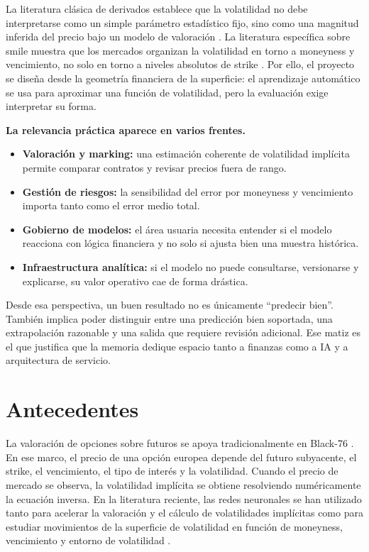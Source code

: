 La literatura clásica de derivados establece que la volatilidad no debe interpretarse como un simple parámetro estadístico fijo, sino como una magnitud inferida del precio bajo un modelo de valoración \citep{black1976pricing,hull2022options}. La literatura específica sobre smile muestra que los mercados organizan la volatilidad en torno a moneyness y vencimiento, no solo en torno a niveles absolutos de strike \citep{derman2016volatility}. Por ello, el proyecto se diseña desde la geometría financiera de la superficie: el aprendizaje automático se usa para aproximar una función de volatilidad, pero la evaluación exige interpretar su forma.

\textbf{La relevancia práctica aparece en varios frentes.}

\begin{itemize}
  \item \textbf{Valoración y marking:} una estimación coherente de volatilidad implícita permite comparar contratos y revisar precios fuera de rango.
  \item \textbf{Gestión de riesgos:} la sensibilidad del error por moneyness y vencimiento importa tanto como el error medio total.
  \item \textbf{Gobierno de modelos:} el área usuaria necesita entender si el modelo reacciona con lógica financiera y no solo si ajusta bien una muestra histórica.
  \item \textbf{Infraestructura analítica:} si el modelo no puede consultarse, versionarse y explicarse, su valor operativo cae de forma drástica.
\end{itemize}

Desde esa perspectiva, un buen resultado no es únicamente ``predecir bien''. También implica poder distinguir entre una predicción bien soportada, una extrapolación razonable y una salida que requiere revisión adicional. Ese matiz es el que justifica que la memoria dedique espacio tanto a finanzas como a IA y a arquitectura de servicio.

\section{Antecedentes}
\label{sec:antecedentes}

La valoración de opciones sobre futuros se apoya tradicionalmente en Black-76 \citep{black1976pricing}. En ese marco, el precio de una opción europea depende del futuro subyacente, el strike, el vencimiento, el tipo de interés y la volatilidad. Cuando el precio de mercado se observa, la volatilidad implícita se obtiene resolviendo numéricamente la ecuación inversa. En la literatura reciente, las redes neuronales se han utilizado tanto para acelerar la valoración y el cálculo de volatilidades implícitas \citep{liu2019pricing} como para estudiar movimientos de la superficie de volatilidad en función de moneyness, vencimiento y entorno de volatilidad \citep{cao2019neural}.

